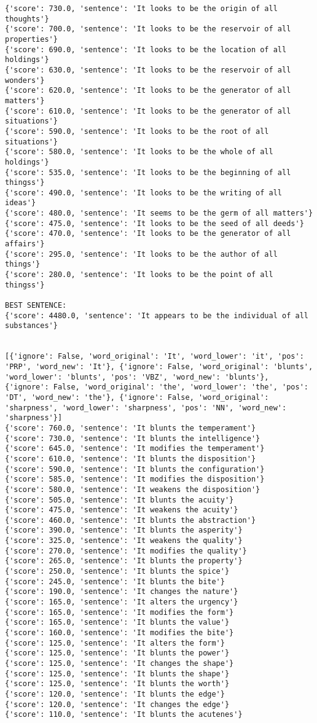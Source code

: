 \documentclass[12pt,a4paper,oneside]{book}
\begin{document}
\begin{verbatim}
{'score': 730.0, 'sentence': 'It looks to be the origin of all thoughts'}
{'score': 700.0, 'sentence': 'It looks to be the reservoir of all properties'}
{'score': 690.0, 'sentence': 'It looks to be the location of all holdings'}
{'score': 630.0, 'sentence': 'It looks to be the reservoir of all wonders'}
{'score': 620.0, 'sentence': 'It looks to be the generator of all matters'}
{'score': 610.0, 'sentence': 'It looks to be the generator of all situations'}
{'score': 590.0, 'sentence': 'It looks to be the root of all situations'}
{'score': 580.0, 'sentence': 'It looks to be the whole of all holdings'}
{'score': 535.0, 'sentence': 'It looks to be the beginning of all thingss'}
{'score': 490.0, 'sentence': 'It looks to be the writing of all ideas'}
{'score': 480.0, 'sentence': 'It seems to be the germ of all matters'}
{'score': 475.0, 'sentence': 'It looks to be the seed of all deeds'}
{'score': 470.0, 'sentence': 'It looks to be the generator of all affairs'}
{'score': 295.0, 'sentence': 'It looks to be the author of all things'}
{'score': 280.0, 'sentence': 'It looks to be the point of all thingss'}

BEST SENTENCE:
{'score': 4480.0, 'sentence': 'It appears to be the individual of all substances'}


[{'ignore': False, 'word_original': 'It', 'word_lower': 'it', 'pos': 'PRP', 'word_new': 'It'}, {'ignore': False, 'word_original': 'blunts', 'word_lower': 'blunts', 'pos': 'VBZ', 'word_new': 'blunts'}, {'ignore': False, 'word_original': 'the', 'word_lower': 'the', 'pos': 'DT', 'word_new': 'the'}, {'ignore': False, 'word_original': 'sharpness', 'word_lower': 'sharpness', 'pos': 'NN', 'word_new': 'sharpness'}]
{'score': 760.0, 'sentence': 'It blunts the temperament'}
{'score': 730.0, 'sentence': 'It blunts the intelligence'}
{'score': 645.0, 'sentence': 'It modifies the temperament'}
{'score': 610.0, 'sentence': 'It blunts the disposition'}
{'score': 590.0, 'sentence': 'It blunts the configuration'}
{'score': 585.0, 'sentence': 'It modifies the disposition'}
{'score': 580.0, 'sentence': 'It weakens the disposition'}
{'score': 505.0, 'sentence': 'It blunts the acuity'}
{'score': 475.0, 'sentence': 'It weakens the acuity'}
{'score': 460.0, 'sentence': 'It blunts the abstraction'}
{'score': 390.0, 'sentence': 'It blunts the asperity'}
{'score': 325.0, 'sentence': 'It weakens the quality'}
{'score': 270.0, 'sentence': 'It modifies the quality'}
{'score': 265.0, 'sentence': 'It blunts the property'}
{'score': 250.0, 'sentence': 'It blunts the spice'}
{'score': 245.0, 'sentence': 'It blunts the bite'}
{'score': 190.0, 'sentence': 'It changes the nature'}
{'score': 165.0, 'sentence': 'It alters the urgency'}
{'score': 165.0, 'sentence': 'It modifies the form'}
{'score': 165.0, 'sentence': 'It blunts the value'}
{'score': 160.0, 'sentence': 'It modifies the bite'}
{'score': 125.0, 'sentence': 'It alters the form'}
{'score': 125.0, 'sentence': 'It blunts the power'}
{'score': 125.0, 'sentence': 'It changes the shape'}
{'score': 125.0, 'sentence': 'It blunts the shape'}
{'score': 125.0, 'sentence': 'It blunts the worth'}
{'score': 120.0, 'sentence': 'It blunts the edge'}
{'score': 120.0, 'sentence': 'It changes the edge'}
{'score': 110.0, 'sentence': 'It blunts the acutenes'}


\end{verbatim}
\end{document}
